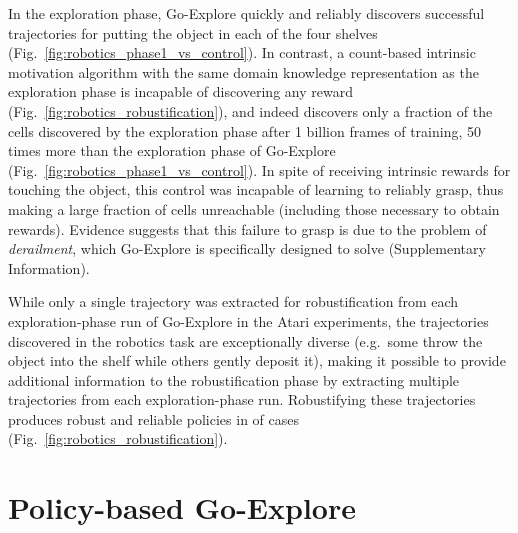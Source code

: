 \documentclass{nature}
\begin{document}
In the exploration phase, Go-Explore quickly and reliably discovers successful trajectories for putting the object in each of the four shelves (Fig.~\ref{fig:robotics_phase1_vs_control}).
In contrast, a count-based intrinsic motivation algorithm with the same domain knowledge representation as the exploration phase is incapable of discovering any reward (Fig.~\ref{fig:robotics_robustification}), and indeed discovers only a fraction of the cells discovered by the exploration phase after 1 billion frames of training, 50 times more than the exploration phase of Go-Explore (Fig.~\ref{fig:robotics_phase1_vs_control}). In spite of receiving intrinsic rewards for touching the object, this control was incapable of learning to reliably grasp, thus making a large fraction of cells unreachable (including those necessary to obtain rewards). Evidence suggests that this failure to grasp is due to the problem of \emph{derailment}, which Go-Explore is specifically designed to solve (Supplementary Information).

While only a single trajectory was extracted for robustification from each exploration-phase
run of Go-Explore in the Atari experiments, the trajectories discovered in the robotics task are exceptionally diverse (e.g.\ some throw the object into the shelf while others gently deposit it), making it possible to provide additional information to the robustification phase by extracting multiple trajectories from each exploration-phase run.
Robustifying these trajectories produces robust and reliable policies in  of cases (Fig.~\ref{fig:robotics_robustification}).

\section*{Policy-based Go-Explore}
\label{sec:policy}
\end{document}
